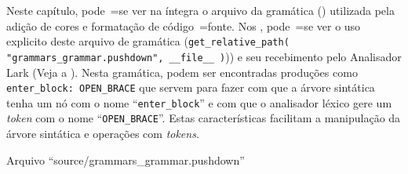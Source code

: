 Neste capítulo,
pode~=se ver na íntegra o arquivo da gramática () utilizada pela adição de cores e
formatação de código~=fonte.
Nos ,
pode~=se ver o uso explicito deste arquivo de gramática (\texttt{get_relative_path( "grammars_grammar.pushdown",
__file__ )})) e
seu recebimento pelo Analisador Lark (Veja a ).
Nesta gramática,
podem ser encontradas produções como \texttt{enter_block:
OPEN_BRACE} que servem para fazer com que a árvore sintática tenha um nó com o nome ``\texttt{enter_block}'' e
com que o analisador léxico gere um \textit{token} com o nome ``\texttt{OPEN_BRACE}''.
Estas características facilitam a manipulação da árvore sintática e
operações com \textit{tokens}.
\begin{code}
\caption{Arquivo ``source/grammars\_grammar.pushdown''}
\label{code:grammarsGrammarPushdown}
\inputminted[firstline=39,firstnumber=1]{antlr}{../source/grammars_grammar.pushdown}
\end{code}
